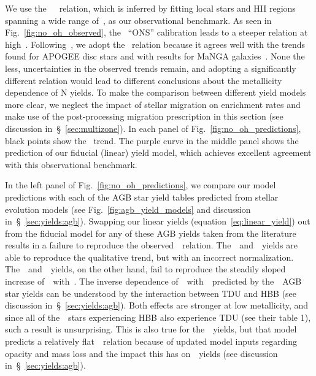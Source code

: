 \documentclass[ms.tex]{subfiles}
\begin{document}
We use the~\citet{Dopita2016}~\ohno~relation, which is inferred by fitting
local stars and HII regions spanning a wide range of~\oh, as our observational
benchmark.
As seen in Fig.~\ref{fig:no_oh_observed}, the~\citet{Pilyugin2010} ``ONS''
calibration leads to a steeper relation at high~\oh.
Following~\citet{Vincenzo2021}, we adopt the~\citet{Dopita2016} relation
because it agrees well with the trends found for APOGEE disc stars and with
results for MaNGA galaxies~\citep[][see
Fig.~\ref{fig:no_oh_observed}]{Belfiore2017}.
None the less, uncertainties in the observed trends remain, and adopting a
significantly different relation would lead to different conclusions about the
metallicity dependence of N yields.
To make the comparison between different yield models more clear, we neglect
the impact of stellar migration on enrichment rates and make use of the
post-processing migration prescription in this section (see discussion
in~\S~\ref{sec:multizone}).
In each panel of Fig.~\ref{fig:no_oh_predictions}, black points show
the~\citet{Dopita2016} trend.
The purple curve in the middle panel shows the prediction of our fiducial
(linear) yield model, which achieves excellent agreement with this
observational benchmark.
\par
In the left panel of Fig.~\ref{fig:no_oh_predictions}, we compare our model
predictions with each of the AGB star yield tables predicted from stellar
evolution models (see Fig.~\ref{fig:agb_yield_models} and discussion
in~\S~\ref{sec:yields:agb}).
Swapping our linear yields (equation~\ref{eq:linear_yield}) out from the
fiducial model for any of these AGB yields taken from the literature results
in a failure to reproduce the observed~\ohno~relation.
The~\cristallo~and~\ventura~yields are able to reproduce the qualitative trend,
but with an incorrect normalization.
The~\karakasten~and~\karakas~yields, on the other hand, fail to reproduce
the steadily sloped increase of~\no~with~\oh.
The inverse dependence of~\no~with~\oh~predicted by the~\karakasten~AGB star
yields can be understood by the interaction between TDU and HBB (see discussion
in~\S~\ref{sec:yields:agb}).
Both effects are stronger at low metallicity, and since all of
the~\karakasten~stars experiencing HBB also experience TDU (see their table 1),
such a result is unsurprising.
This is also true for the~\karakas~yields, but that model predicts a
relatively flat~\ohno~relation because of updated model inputs regarding
opacity and mass loss and the impact this has on~\Nfourteen~yields (see
discussion in~\S~\ref{sec:yields:agb}).
\end{document}
